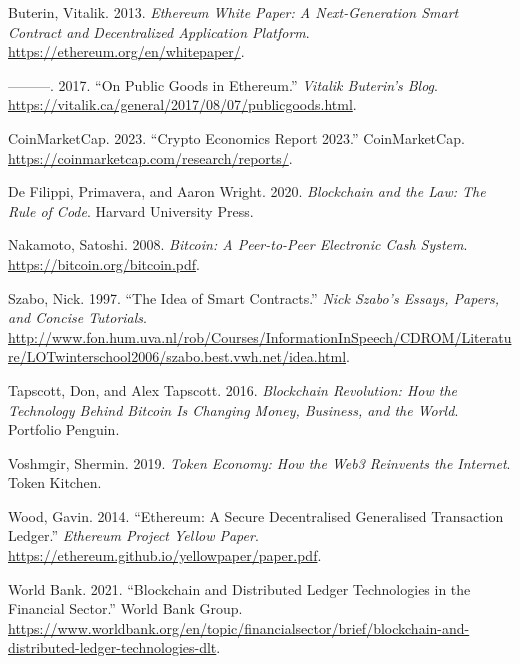 \documentclass[
  Letterpaper,
]{scrbook}
\newlength{\cslhangindent}
\newenvironment{CSLReferences}[2] %
 {\begin{list}{}{%
  \setlength{\itemindent}{0pt}
  \setlength{\leftmargin}{0pt}
  \setlength{\parsep}{0pt}
  \ifodd #1
   \setlength{\leftmargin}{\cslhangindent}
   \setlength{\itemindent}{-1\cslhangindent}
  \fi
  \setlength{\itemsep}{#2\baselineskip}}}
 {\end{list}}
\begin{document}
\label{refs}
\begin{CSLReferences}{1}{0}
Buterin, Vitalik. 2013. \emph{Ethereum White Paper: A Next-Generation
Smart Contract and Decentralized Application Platform}.
\url{https://ethereum.org/en/whitepaper/}.

---------. 2017. {``On Public Goods in Ethereum.''} \emph{Vitalik
Buterin's Blog}.
\url{https://vitalik.ca/general/2017/08/07/publicgoods.html}.

CoinMarketCap. 2023. {``Crypto Economics Report 2023.''} CoinMarketCap.
\url{https://coinmarketcap.com/research/reports/}.

De Filippi, Primavera, and Aaron Wright. 2020. \emph{Blockchain and the
Law: The Rule of Code}. Harvard University Press.

Nakamoto, Satoshi. 2008. \emph{Bitcoin: A Peer-to-Peer Electronic Cash
System}. \url{https://bitcoin.org/bitcoin.pdf}.

Szabo, Nick. 1997. {``The Idea of Smart Contracts.''} \emph{Nick Szabo's
Essays, Papers, and Concise Tutorials}.
\url{http://www.fon.hum.uva.nl/rob/Courses/InformationInSpeech/CDROM/Literature/LOTwinterschool2006/szabo.best.vwh.net/idea.html}.

Tapscott, Don, and Alex Tapscott. 2016. \emph{Blockchain Revolution: How
the Technology Behind Bitcoin Is Changing Money, Business, and the
World}. Portfolio Penguin.

Voshmgir, Shermin. 2019. \emph{Token Economy: How the Web3 Reinvents the
Internet}. Token Kitchen.

Wood, Gavin. 2014. {``Ethereum: A Secure Decentralised Generalised
Transaction Ledger.''} \emph{Ethereum Project Yellow Paper}.
\url{https://ethereum.github.io/yellowpaper/paper.pdf}.

World Bank. 2021. {``Blockchain and Distributed Ledger Technologies in
the Financial Sector.''} World Bank Group.
\url{https://www.worldbank.org/en/topic/financialsector/brief/blockchain-and-distributed-ledger-technologies-dlt}.

\end{CSLReferences}


\backmatter
\end{document}
